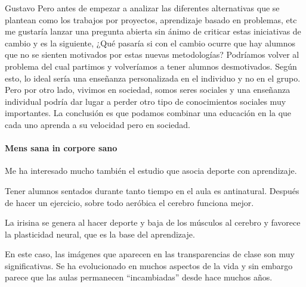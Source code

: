 \begin{opin}{\guscolor}{Gustavo}
Pero antes de empezar a analizar las diferentes alternativas que se plantean como los trabajos por proyectos, aprendizaje basado en problemas, etc me gustaría lanzar una pregunta abierta sin ánimo de criticar estas iniciativas de cambio y es la siguiente, ¿Qué pasaría si con el cambio ocurre que hay alumnos que no se sienten motivados por estas nuevas metodologías? Podríamos volver al problema del cual partimos y volveríamos a tener alumnos desmotivados. Según esto, lo ideal sería una enseñanza personalizada en el individuo y no en el grupo. Pero por otro lado, vivimos en sociedad, somos seres sociales y una enseñanza individual podría dar lugar a perder otro tipo de conocimientos sociales muy importantes. La conclusión es que podamos combinar una educación en la que cada uno aprenda a su velocidad pero en sociedad.

\paragraph{Mens sana in corpore sano}
Me ha interesado mucho también el estudio que asocia deporte con aprendizaje.


Tener alumnos sentados durante tanto tiempo en el aula es antinatural. Después de hacer un ejercicio, sobre todo aeróbica el cerebro funciona mejor.


La irisina se genera al hacer deporte y baja de los músculos al cerebro y favorece la plasticidad neural, que es la base del aprendizaje.


En este caso, las imágenes que aparecen en las transparencias de clase son muy significativas. Se ha evolucionado en muchos aspectos de la vida y sin embargo parece que las aulas permanecen “incambiadas” desde hace muchos años.
\end{opin}


